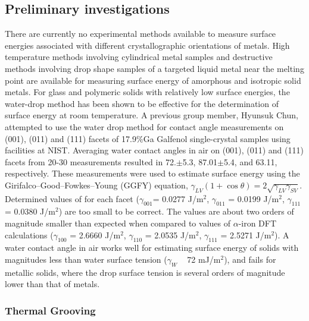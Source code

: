 \subsection{Preliminary investigations}
There are currently no experimental methods available to measure surface energies associated with different crystallographic orientations of metals. High temperature methods involving cylindrical metal samples and destructive methods involving drop shape samples of a targeted liquid metal near the melting point are available for measuring surface energy of amorphous and isotropic solid metals.\cite{Egry2010,Aqra2011,Cao2011} For glass and polymeric solids with relatively low surface energies, the water-drop method has been shown to be effective for the determination of surface energy at room temperature.\cite{Ahadian2010,Kwok2000,Tavana2005} A previous group member, Hyunsuk Chun, attempted to use the water drop method for contact angle measurements on \hkl(001), \hkl(011) and \hkl(111) facets of 17.9$\%$Ga Galfenol single-crystal samples using facilities at NIST.\cite{Costa2016} Averaging  water contact angles in air on \hkl(001), \hkl(011) and \hkl(111) facets from 20-30 measurements resulted in 72.$\pm$5.3\degree, 87.01$\pm$5.4\degree, and 63.11\degree, respectively. These measurements were used to estimate surface energy using the Girifalco–Good–Fowkes–Young (GGFY) equation, $\gamma_{LV} (1+\cos\theta) = 2 \sqrt{\gamma_{LV}\gamma_{SV}}$. Determined values of \gamSV for each facet ($ \gamma_{001} $= 0.0277 J/m$^2$, $\gamma_{011}$ = 0.0199 J/m$^2$, $\gamma_{111}$ = 0.0380 J/m$^2 $) are too small to be correct. The values are about two orders of magnitude smaller than expected when compared to values of $\alpha$-iron DFT calculations ($\gamma_{100}$ = 2.6660 J/m$^2$, $\gamma_{110}$ = 2.0535 J/m$^2$, $\gamma_{111}$ = 2.5271 J/m$^2$).\cite{Wang2000} A water contact angle in air works well for estimating surface energy of solids with magnitudes less than water surface tension ($\gamma_W$ ~ 72 mJ/m$^2$), and fails for metallic solids, where the drop surface tension is several orders of magnitude lower than that of metals. 


\subsubsection{Thermal Grooving}

